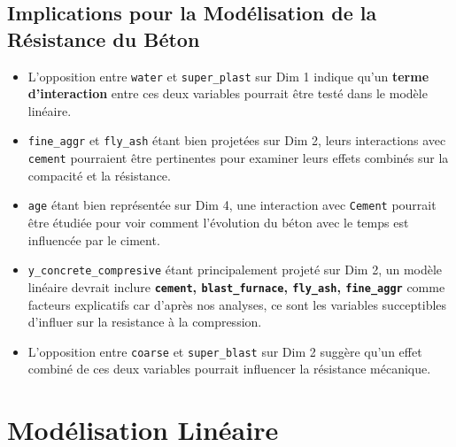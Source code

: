 \documentclass[
  12pt,
]{article}
\providecommand{\tightlist}{%
  \setlength{\itemsep}{0pt}\setlength{\parskip}{0pt}}
\begin{document}
\subsection{Implications pour la Modélisation de la Résistance du
Béton}\label{implications-pour-la-moduxe9lisation-de-la-ruxe9sistance-du-buxe9ton}

\begin{itemize}
\tightlist
\item
  L'opposition entre \texttt{water} et \texttt{super\_plast} sur Dim 1
  indique qu'un \textbf{terme d'interaction} entre ces deux variables
  pourrait être testé dans le modèle linéaire.
\item
  \texttt{fine\_aggr} et \texttt{fly\_ash} étant bien projetées sur Dim
  2, leurs interactions avec \texttt{cement} pourraient être pertinentes
  pour examiner leurs effets combinés sur la compacité et la résistance.
\item
  \texttt{age} étant bien représentée sur Dim 4, une interaction avec
  \texttt{Cement} pourrait être étudiée pour voir comment l'évolution du
  béton avec le temps est influencée par le ciment.
\item
  \texttt{y\_concrete\_compresive} étant principalement projeté sur Dim
  2, un modèle linéaire devrait inclure \textbf{\texttt{cement},
  \texttt{blast\_furnace}, \texttt{fly\_ash}, \texttt{fine\_aggr}} comme
  facteurs explicatifs car d'après nos analyses, ce sont les variables
  succeptibles d'influer sur la resistance à la compression.
\item
  L'opposition entre \texttt{coarse} et \texttt{super\_blast} sur Dim 2
  suggère qu'un effet combiné de ces deux variables pourrait influencer
  la résistance mécanique.
\end{itemize}

\section{Modélisation Linéaire}\label{moduxe9lisation-linuxe9aire}
\end{document}
